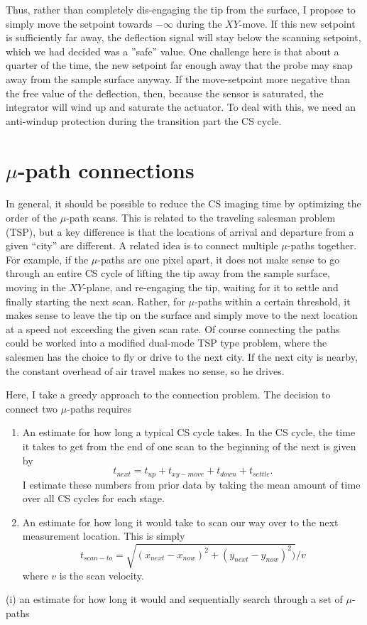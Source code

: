 \documentclass[11pt]{article}
\begin{document}
Thus, rather than completely dis-engaging the tip from the surface, I propose to simply move the setpoint towards $-\infty$ during the $XY$-move. If this new setpoint is sufficiently far away, the deflection signal will stay below the scanning setpoint, which we had decided was a ''safe'' value. One challenge here is that about a quarter of the time, the new setpoint far enough away that the probe may snap away from the sample surface anyway. If the move-setpoint more negative than the free value of the deflection, then, because the sensor is saturated, the integrator will wind up and saturate the actuator. To deal with this, we need an anti-windup protection during the transition part the CS cycle.

\section{$\mu$-path connections}
In general, it should be possible to reduce the CS imaging time by optimizing the order of the $\mu$-path scans. This is related to the traveling salesman problem (TSP), but a key difference is that the locations of arrival and departure from a given ``city'' are different. A related idea is to connect multiple $\mu$-paths together. For example, if the $\mu$-paths are one pixel apart, it does not make sense to go through an entire CS cycle of lifting the tip away from the sample surface, moving in the $XY$-plane, and re-engaging the tip, waiting for it to settle and finally starting the next scan. Rather, for $\mu$-paths within a certain threshold, it makes sense to leave the tip on the surface and simply move to the next location at a speed not exceeding the given scan rate. Of course connecting the paths could be worked into a modified dual-mode TSP type problem, where the salesmen has the choice to fly or drive to the next city. If the next city is nearby, the constant overhead of air travel makes no sense, so he drives.

Here, I take a greedy approach to the connection problem. The decision to connect two $\mu$-paths requires
\begin{enumerate}
\item An estimate for how long a typical CS cycle takes. In the CS cycle, the time it takes to get from the end of one scan to the beginning of the next is given by
  \begin{equation}
    t_{next} = t_{up} + t_{xy-move} + t_{down} + t_{settle}.
  \end{equation}
  I estimate these numbers from prior data by taking the mean amount of time over all CS cycles for each stage.
\item An estimate for how long it would take to scan our way over to the next measurement location. This is simply
  \begin{equation}
    t_{scan-to} = \sqrt{(x_{next}-x_{now})^2 + (y_{next}-y_{now})^2) }/ v
    \end{equation}
    where $v$ is the scan velocity.
\end{enumerate}
(i) an estimate for how long it would and sequentially search through a set of $\mu$-paths
\end{document}
